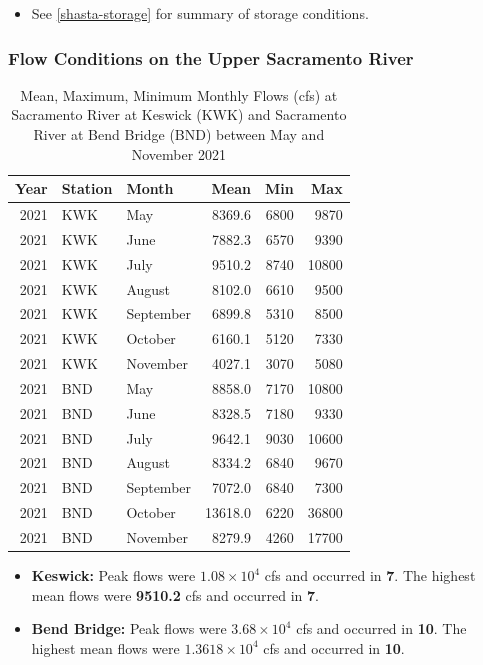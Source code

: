 \documentclass[
]{book}
\providecommand{\tightlist}{%
  \setlength{\itemsep}{0pt}\setlength{\parskip}{0pt}}
\theoremstyle{definition}
\theoremstyle{definition}
\theoremstyle{definition}
\theoremstyle{definition}
\theoremstyle{remark}
\begin{document}
\begin{itemize}
\tightlist
\item
  See \ref{shasta-storage} for summary of storage conditions.
\end{itemize}

\hypertarget{flow-conditions-on-the-upper-sacramento-river-1}{%
\subsubsection{Flow Conditions on the Upper Sacramento River}\label{flow-conditions-on-the-upper-sacramento-river-1}}

\begin{table}
\centering
\caption{Mean, Maximum, Minimum Monthly Flows (cfs) at Sacramento River at Keswick (KWK) and Sacramento River at Bend Bridge (BND) between May and November 2021}
\centering
\begin{tabular}[t]{rllrrr}
\hline
Year & Station & Month & Mean & Min & Max\\
\hline
2021 & KWK & May & 8369.6 & 6800 & 9870\\
\hline
2021 & KWK & June & 7882.3 & 6570 & 9390\\
\hline
2021 & KWK & July & 9510.2 & 8740 & 10800\\
\hline
2021 & KWK & August & 8102.0 & 6610 & 9500\\
\hline
2021 & KWK & September & 6899.8 & 5310 & 8500\\
\hline
2021 & KWK & October & 6160.1 & 5120 & 7330\\
\hline
2021 & KWK & November & 4027.1 & 3070 & 5080\\
\hline
2021 & BND & May & 8858.0 & 7170 & 10800\\
\hline
2021 & BND & June & 8328.5 & 7180 & 9330\\
\hline
2021 & BND & July & 9642.1 & 9030 & 10600\\
\hline
2021 & BND & August & 8334.2 & 6840 & 9670\\
\hline
2021 & BND & September & 7072.0 & 6840 & 7300\\
\hline
2021 & BND & October & 13618.0 & 6220 & 36800\\
\hline
2021 & BND & November & 8279.9 & 4260 & 17700\\
\hline
\end{tabular}
\end{table}

\begin{itemize}
\tightlist
\item
  \textbf{Keswick:} Peak flows were \textbf{\ensuremath{1.08\times 10^{4}}} cfs and occurred in \textbf{7}. The highest mean flows were \textbf{9510.2} cfs and occurred in \textbf{7}.
\item
  \textbf{Bend Bridge:} Peak flows were \textbf{\ensuremath{3.68\times 10^{4}}} cfs and occurred in \textbf{10}. The highest mean flows were \textbf{\ensuremath{1.3618\times 10^{4}}} cfs and occurred in \textbf{10}.
\end{itemize}
\end{document}
